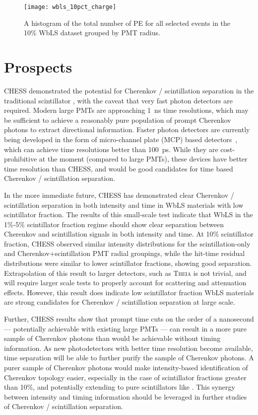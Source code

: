 \begin{figure}
\centering
\texttt{[image: wbls\_10pct\_charge]}
\caption{\label{fig:wbls10pct_totalq}A histogram of the total number of PE for all selected events in the 10\% WbLS dataset grouped by PMT radius.}
\end{figure}

\section{Prospects}

CHESS demonstrated the potential for Cherenkov / scintillation separation in the traditional scintillator {\labppo}, with the caveat that very fast photon detectors are required.
Modern large PMTs are approaching 1~ns time resolutions, which may be sufficient to achieve a reasonably pure population of prompt Cherenkov photons to extract directional information.
Faster photon detectors are currently being developed in the form of micro-channel plate (MCP) based detectors~\cite{lappd,lappd2}, which can achieve time resolutions better than 100~ps.
While they are cost-prohibitive at the moment (compared to large PMTs), these devices have better time resolution than CHESS, and would be good candidates for time based Cherenkov / scintillation separation.

In the more immediate future, CHESS has demonstrated clear Cherenkov / scintillation separation in both intensity and time in WbLS materials with low scintillator fraction. 
The results of this small-scale test indicate that WbLS in the 1\%-5\% scintillator fraction regime should show clear separation between Cherenkov and scintillation signals in both intensity and time.
At 10\% scintillator fraction, CHESS observed similar intensity distributions for the scintillation-only and Cherenkov+scintillation PMT radial groupings, while the hit-time residual distributions were similar to lower scintillator fractions, showing good separation.
Extrapolation of this result to larger detectors, such as \textsc{Theia} is not trivial, and will require larger scale tests to properly account for scattering and attenuation effects.
However, this result does indicate low scintillator fraction WbLS materials are strong candidates for Cherenkov / scintillation separation at large scale.

Further, CHESS results show that prompt time cuts on the order of a nanosecond --- potentially achievable with existing large PMTs --- can result in a more pure sample of Cherenkov photons than would be achievable without timing information.
As new photodetectors with better time resolution become available, time separation will be able to further purify the sample of Cherenkov photons.
A purer sample of Cherenkov photons would make intensity-based identification of Cherenkov topology easier, especially in the case of scintillator fractions greater than 10\%, and potentially extending to pure scintillators like {\labppo}.
This synergy between intensity and timing information should be leveraged in further studies of Cherenkov / scintillation separation.
